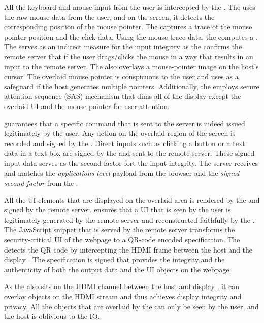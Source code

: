 \myparagraph{\Pop} All the keyboard and mouse input from the user is intercepted by the \device. The \device uses the raw mouse data from the user, and on the screen, it detects the corresponding position of the mouse pointer. The \device captures a trace of the mouse pointer position and the click data. Using the mouse trace data, the \device computes a \emph{\pop}. The \pop serves as an indirect measure for the input integrity as the \device confirms the remote server that if the user drags/clicks the mouse in a way that results in an input to the remote server. The \device also overlays a mouse-pointer image on the host's cursor. The overlaid mouse pointer is conspicuous to the user and uses as a safeguard if the host generates multiple pointers. Additionally, the \device employs secure attention sequence (SAS) mechanism that dims all of the display except the overlaid UI and the mouse pointer for user attention.

\myparagraph{\poa} \Poa guarantees that a specific command that is sent to the server is indeed issued legitimately by the user. Any action on the overlaid region of the screen is recorded and signed by the \device.  Direct inputs such as clicking a button or a text data in a text box are signed by the \device and sent to the remote server. These signed input data serves as the second-factor fort the input integrity. The server receives and matches the \emph{applications-level} payload from the browser and the \emph{signed second factor} from the \device. 

\myparagraph{\Poui} All the UI elements that are displayed on the overlaid area is rendered by the \device and signed by the remote server. \Poui ensures that a UI that is seen by the user is legitimately generated by the remote server and reconstructed faithfully by the \device. The JavaScript snippet that is served by the remote server transforms the security-critical UI of the webpage to a QR-code encoded specification. The \device detects the QR code by intercepting the HDMI frame between the host and the display \device. The specification is signed that provides the integrity and the authenticity of both the output data and the UI objects on the webpage. 

 As the \device also sits on the HDMI channel between the host and display \device, it can overlay objects on the HDMI stream and thus achieves display integrity and privacy. All the objects that are overlaid by the \device can only be seen by the user, and the host is oblivious to the IO.


